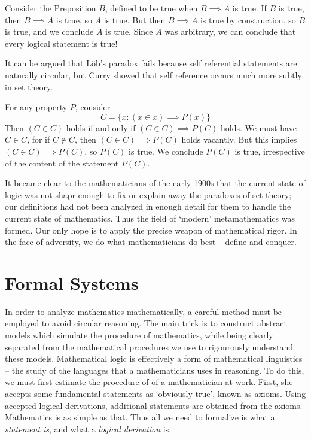 \begin{example}[L\"{o}b]
    Consider the Preposition $B$, defined to be true when $B \implies A$ is true. If $B$ is true, then $B \implies A$ is true, so $A$ is true. But then $B \implies A$ is true by construction, so $B$ is true, and we conclude $A$ is true. Since $A$ was arbitrary, we can conclude that every logical statement is true!
\end{example}

It can be argued that L\"{o}b's paradox fails because self referential statements are naturally circular, but Curry showed that self reference occurs much more subtly in set theory.

\begin{example}[Curry]
    For any property $P$, consider
    \[ C = \{ x : (x \in x) \implies P(x) \} \]
    Then $(C \in C)$ holds if and only if $(C \in C) \implies P(C)$ holds. We must have $C \in C$, for if $C \not \in C$, then $(C \in C) \implies P(C)$ holds vacantly. But this implies $(C \in C) \implies P(C)$, so $P(C)$ is true. We conclude $P(C)$ is true, irrespective of the content of the statement $P(C)$.
\end{example}

It became clear to the mathematicians of the early 1900s that the current state of logic was not shapr enough to fix or explain away the paradoxes of set theory; our definitions had not been analyzed in enough detail for them to handle the current state of mathematics. Thus the field of `modern' metamathematics was formed. Our only hope is to apply the precise weapon of mathematical rigor. In the face of adversity, we do what mathematicians do best -- define and conquer.

\section{Formal Systems}

In order to analyze mathematics mathematically, a careful method must be employed to avoid circular reasoning. The main trick is to construct abstract models which simulate the procedure of mathematics, while being clearly separated from the mathematical procedures we use to rigourously understand these models. Mathematical logic is effectively a form of mathematical linguistics -- the study of the languages that a mathematicians uses in reasoning. To do this, we must first estimate the procedure of of a mathematician at work. First, she accepts some fundamental statements as `obviously true', known as axioms. Using accepted logical derivations, additional statements are obtained from the axioms. Mathematics is as simple as that. Thus all we need to formalize is what a {\it statement is}, and what a {\it logical derivation} is.

